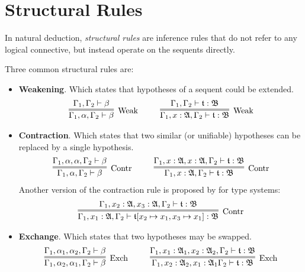 \section{Structural Rules}

In natural deduction, \textit{structural rules} are inference rules that do not refer to any logical connective, but instead operate on the sequents directly.

Three common structural rules are:
\begin{itemize}
    \item \textbf{Weakening}. Which states that hypotheses of a sequent could be extended.
    \begin{gather*}
        \infer=[\mbox{Weak}]{\Gamma_1, \alpha, \Gamma_2 \vdash \beta}{\Gamma_1, \Gamma_2 \vdash \beta}
        ~~~~ ~~~~
        \infer=[\mbox{Weak}]{\Gamma_1, x : \A, \Gamma_2\vdash \t : \mathfrak{B}}{\Gamma_1, \Gamma_2\vdash \t : \mathfrak{B}}
    \end{gather*}
    \item \textbf{Contraction}. Which states that two similar (or unifiable) hypotheses can be replaced by a single hypothesis.
    \begin{gather*}
        \infer=[\mbox{Contr}]{\Gamma_1, \alpha, \Gamma_2 \vdash \beta}{\Gamma_1, \alpha, \alpha, \Gamma_2 \vdash \beta}
        ~~~~ ~~~~
        \infer=[\mbox{Contr}]{\Gamma_1, x : \A, \Gamma_2 \vdash \t : \mathfrak{B}}{\Gamma_1, x : \A, x : \A, \Gamma_2 \vdash \t : \mathfrak{B}}
    \end{gather*}
    Another version of the contraction rule is proposed by \cite{DavidWalker2004} for type systems:
    \begin{gather*}
        \infer=[\mbox{Contr}]{\Gamma_1, x_1 : \A, \Gamma_2 \vdash \t[x_2 \mapsto x_1, x_3 \mapsto x_1] : \mathfrak{B}}{\Gamma_1, x_2 : \A, x_3 : \A, \Gamma_2 \vdash \t : \mathfrak{B}}
    \end{gather*}
    \item \textbf{Exchange}. Which states that two hypotheses may be swapped.
    \begin{gather*}
        \infer=[\mbox{Exch}]{\Gamma_1, \alpha_2, \alpha_1, \Gamma_2 \vdash \beta}{\Gamma_1, \alpha_1, \alpha_2, \Gamma_2 \vdash \beta}
        ~~~~ ~~~~
        \infer=[\mbox{Exch}]{\Gamma_1, x_2 : \A_2, x_1 : \A_1 \Gamma_2 \vdash \t : \mathfrak{B}}{\Gamma_1, x_1 : \A_1, x_2 : \A_2, \Gamma_2 \vdash \t : \mathfrak{B}}
    \end{gather*}
\end{itemize}

